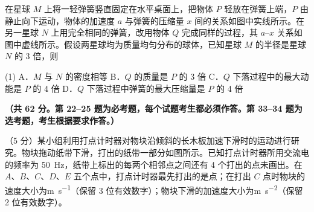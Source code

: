 \begin{question}
在星球 $M$ 上将一轻弹簧竖直固定在水平桌面上，把物体 $P$ 轻放在弹簧上端，$P$ 由静止向下运动，物体的加速度 $a$ 与弹簧的压缩量 $x$ 间的关系如图中实线所示。在另一星球 $N$ 上用完全相同的弹簧，改用物体 $Q$ 完成同样的过程，其 $a$--$x$ 关系如图中虚线所示。假设两星球均为质量均匀分布的球体，已知星球 $M$ 的半径是星球 $N$ 的 3 倍，则\gkblank


\begin{gkopts}(1)
  \task A．$M$ 与 $N$ 的密度相等
  \task B．$Q$ 的质量是 $P$ 的 3 倍
  \task C．$Q$ 下落过程中的最大动能是 $P$ 的 4 倍
  \task D．$Q$ 下落过程中弹簧的最大压缩量是 $P$ 的 4 倍
\end{gkopts}
\end{question}


\textbf{（共 62 分。第 22--25 题为必考题，每个试题考生都必须作答。第 33--34 题为选考题，考生根据要求作答。）}


\begin{question}
（5 分）某小组利用打点计时器对物块沿倾斜的长木板加速下滑时的运动进行研究。物块拖动纸带下滑，打出的纸带一部分如图所示。已知打点计时器所用交流电的频率为 \SI{50}{Hz}，纸带上标出的每两个相邻点之间还有 4 个打出的点未画出。在 $A$、$B$、$C$、$D$、$E$ 五个点中，打点计时器最先打出的是\gkblank 点；在打出 $C$ 点时物块的速度大小为\gkblank \si{\metre\per\second}（保留 3 位有效数字）；物块下滑的加速度大小为\gkblank \si{\metre\per\second\squared}（保留 2 位有效数字）。

\end{question}

